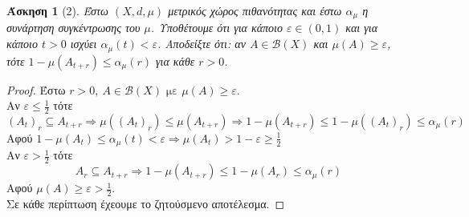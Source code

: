 \documentclass{amsbook}
\newtheorem*{problem}{Άσκηση}
\begin{document}
\begin{problem}[2]
Έστω $(X,d,\mu )$ μετρικός χώρος πιθανότητας και
έστω $\alpha_{\mu }$ η συνάρτηση συγκέντρωσης του $\mu $. Υποθέτουμε
ότι για κάποιο $\varepsilon \in (0,1)$ και για κάποιο $t>0$ ισχύει
$\alpha_{\mu }(t)<\varepsilon $. Αποδείξτε ότι: αν $A \in \mathcal{B}(X)$ και $\mu (A)\geq \varepsilon $, τότε $1-\mu (A_{t+r})\leq
\alpha_{\mu }(r)$ για κάθε $r>0$.    
\end{problem}
\begin{proof}
Έστω \(r > 0, \ A \in \mathcal{B}(X) \text{ με } \mu(A) \geq \varepsilon\). \\
Αν \(\varepsilon \leq \frac{1}{2}\) τότε 
\[(A_t)_r \subseteq A_{t+r} \Rightarrow \mu((A_t)_r) \leq \mu(A_{t+r})
\Rightarrow 1-\mu(A_{t+r}) \leq 1-\mu((A_t)_r) \leq \alpha_{\mu}(r) \]
Αφού \(1-\mu(A_t) \leq \alpha_{\mu}(t) < \varepsilon \Rightarrow 
\mu(A_t) > 1-\varepsilon \geq \frac{1}{2}\)\\
Αν \(\varepsilon > \frac{1}{2}\) τότε 
\[A_r \subseteq A_{t+r} \Rightarrow 1-\mu(A_{t+r}) \leq 1-\mu(A_r) \leq \alpha_{\mu}(r)\]
Αφού \(\mu(A) \geq \varepsilon > \frac{1}{2}\).\\
Σε κάθε περίπτωση έχεουμε το ζητούσμενο αποτέλεσμα.  
\end{proof}
\end{document}
